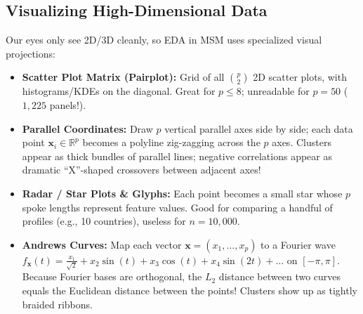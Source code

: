 \documentclass[11pt, a4paper]{article}
\begin{document}
\subsection{Visualizing High-Dimensional Data}
Our eyes only see 2D/3D cleanly, so EDA in MSM uses specialized visual projections:
\begin{itemize}
    \item \textbf{Scatter Plot Matrix (Pairplot):} Grid of all $\binom{p}{2}$ 2D scatter plots, with histograms/KDEs on the diagonal. Great for $p \le 8$; unreadable for $p = 50$ ($1{,}225$ panels!).
    \item \textbf{Parallel Coordinates:} Draw $p$ vertical parallel axes side by side; each data point $\mathbf{x}_i \in \mathbb{R}^p$ becomes a polyline zig-zagging across the $p$ axes. Clusters appear as thick bundles of parallel lines; negative correlations appear as dramatic ``X''-shaped crossovers between adjacent axes!
    \item \textbf{Radar / Star Plots \& Glyphs:} Each point becomes a small star whose $p$ spoke lengths represent feature values. Good for comparing a handful of profiles (e.g., 10 countries), useless for $n = 10{,}000$.
    \item \textbf{Andrews Curves:} Map each vector $\mathbf{x} = (x_1, \dots, x_p)$ to a Fourier wave $f_{\mathbf{x}}(t) = \frac{x_1}{\sqrt{2}} + x_2 \sin(t) + x_3 \cos(t) + x_4 \sin(2t) + \dots$ on $[-\pi, \pi]$. Because Fourier bases are orthogonal, the $L_2$ distance between two curves equals the Euclidean distance between the points! Clusters show up as tightly braided ribbons.
\end{itemize}
\end{document}

